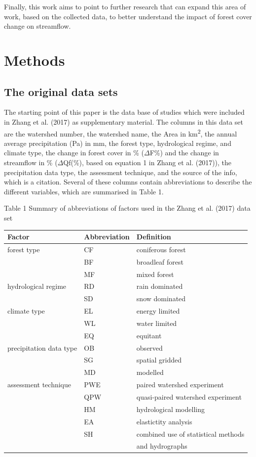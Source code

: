 \documentclass[]{elsarticle} %
\begin{document}
Finally, this work aims to point to further research that can expand
this area of work, based on the collected data, to better understand the
impact of forest cover change on streamflow.

\hypertarget{methods}{%
\section{Methods}\label{methods}}

\hypertarget{the-original-data-sets}{%
\subsection{The original data sets}\label{the-original-data-sets}}

The starting point of this paper is the data base of studies which were
included in Zhang et al. (2017) as supplementary material. The columns
in this data set are the watershed number, the watershed name, the Area
in km\textsuperscript{2}, the annual average precipitation (Pa) in mm,
the forest type, hydrological regime, and climate type, the change in
forest cover in \% (\(\Delta\)F\%) and the change in streamflow in \%
(\(\Delta\)Qf(\%), based on equation 1 in Zhang et al. (2017)), the
precipitation data type, the assessment technique, and the source of the
info, which is a citation. Several of these columns contain
abbreviations to describe the different variables, which are summarised
in Table 1.

Table 1 Summary of abbreviations of factors used in the Zhang et al.
(2017) data set

\begin{longtable}[]{@{}lll@{}}
\toprule
Factor & Abbreviation & Definition\tabularnewline
\midrule
\endhead
forest type & CF & coniferous forest\tabularnewline
& BF & broadleaf forest\tabularnewline
& MF & mixed forest\tabularnewline
hydrological regime & RD & rain dominated\tabularnewline
& SD & snow dominated\tabularnewline
climate type & EL & energy limited\tabularnewline
& WL & water limited\tabularnewline
& EQ & equitant\tabularnewline
precipitation data type & OB & observed\tabularnewline
& SG & spatial gridded\tabularnewline
& MD & modelled\tabularnewline
assessment technique & PWE & paired watershed experiment\tabularnewline
& QPW & quasi-paired watershed experiment\tabularnewline
& HM & hydrological modelling\tabularnewline
& EA & elastictity analysis\tabularnewline
& SH & combined use of statistical methods\tabularnewline
& & and hydrographs\tabularnewline
\bottomrule
\end{longtable}
\end{document}

